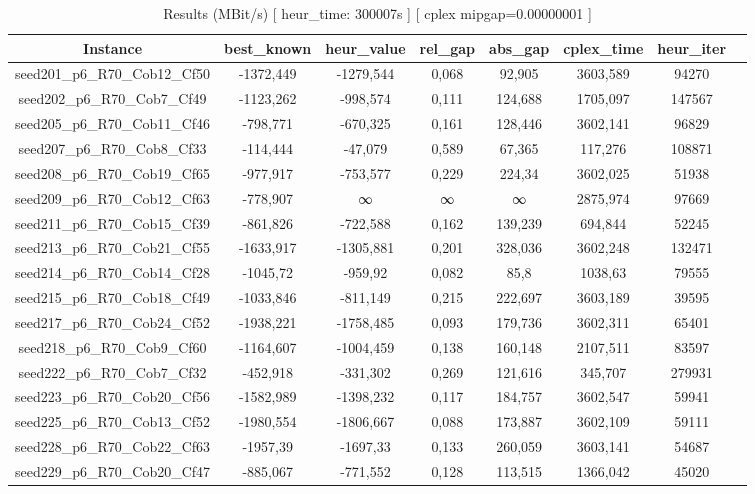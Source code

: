 \documentclass[a4paper]{article}
\begin{document}
\begin{center}
\begin{longtable}{cccccccc}
\caption{Results (MBit/s) [ heur\_time: 300007s ]  [ cplex mipgap=0.00000001 ]}
\tabularnewline
\hline
Instance & best\_known & heur\_value & rel\_gap & abs\_gap & cplex\_time & heur\_iter\\
\hline
seed201\_p6\_R70\_Cob12\_Cf50 & -1372,449 & -1279,544 & 0,068 & 92,905 & 3603,589 & 94270\\
\hline
seed202\_p6\_R70\_Cob7\_Cf49 & -1123,262 & -998,574 & 0,111 & 124,688 & 1705,097 & 147567\\
\hline
seed205\_p6\_R70\_Cob11\_Cf46 & -798,771 & -670,325 & 0,161 & 128,446 & 3602,141 & 96829\\
\hline
seed207\_p6\_R70\_Cob8\_Cf33 & -114,444 & -47,079 & 0,589 & 67,365 & 117,276 & 108871\\
\hline
seed208\_p6\_R70\_Cob19\_Cf65 & -977,917 & -753,577 & 0,229 & 224,34 & 3602,025 & 51938\\
\hline
seed209\_p6\_R70\_Cob12\_Cf63 & -778,907 & ∞ & ∞ & ∞ & 2875,974 & 97669\\
\hline
seed211\_p6\_R70\_Cob15\_Cf39 & -861,826 & -722,588 & 0,162 & 139,239 & 694,844 & 52245\\
\hline
seed213\_p6\_R70\_Cob21\_Cf55 & -1633,917 & -1305,881 & 0,201 & 328,036 & 3602,248 & 132471\\
\hline
seed214\_p6\_R70\_Cob14\_Cf28 & -1045,72 & -959,92 & 0,082 & 85,8 & 1038,63 & 79555\\
\hline
seed215\_p6\_R70\_Cob18\_Cf49 & -1033,846 & -811,149 & 0,215 & 222,697 & 3603,189 & 39595\\
\hline
seed217\_p6\_R70\_Cob24\_Cf52 & -1938,221 & -1758,485 & 0,093 & 179,736 & 3602,311 & 65401\\
\hline
seed218\_p6\_R70\_Cob9\_Cf60 & -1164,607 & -1004,459 & 0,138 & 160,148 & 2107,511 & 83597\\
\hline
seed222\_p6\_R70\_Cob7\_Cf32 & -452,918 & -331,302 & 0,269 & 121,616 & 345,707 & 279931\\
\hline
seed223\_p6\_R70\_Cob20\_Cf56 & -1582,989 & -1398,232 & 0,117 & 184,757 & 3602,547 & 59941\\
\hline
seed225\_p6\_R70\_Cob13\_Cf52 & -1980,554 & -1806,667 & 0,088 & 173,887 & 3602,109 & 59111\\
\hline
seed228\_p6\_R70\_Cob22\_Cf63 & -1957,39 & -1697,33 & 0,133 & 260,059 & 3603,141 & 54687\\
\hline
seed229\_p6\_R70\_Cob20\_Cf47 & -885,067 & -771,552 & 0,128 & 113,515 & 1366,042 & 45020\\

\end{longtable}
\end{center}
\end{document}

